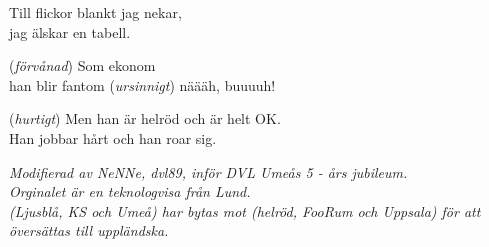 Till flickor blankt jag nekar,\\
jag älskar en tabell.\par
\vspace{10pt}
(\textit{förvånad}) Som ekonom\\
han blir fantom (\textit{ursinnigt}) näääh, buuuuh!\par
\vspace{10pt}
(\textit{hurtigt}) \revrpt Men han är helröd och är helt OK.\\
Han jobbar hårt och han roar sig.\rpt\par
\vspace{10pt}
{\footnotesize\textit{Modifierad av NeNNe, dvl89, inför
    DVL Umeås 5 - års jubileum.\\ Orginalet är en
    teknologvisa från Lund.\\ (Ljusblå, KS och Umeå) har bytas mot
    (helröd, FooRum och Uppsala) för att översättas till uppländska.}}
